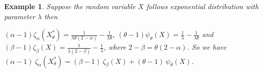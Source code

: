 \documentclass[11pt,reqno]{amsart}
\theoremstyle{tight}
\newtheorem{example}{Example}[section]
\begin{document}
\begin{example}
Suppose the random variable
$X$ follows exponential distribution with parameter $\lambda$ then


$(\alpha-1)\zeta_\alpha(X_\theta^*)=\frac{1}{\lambda\theta(2-\alpha)}-\frac{1}{\lambda \theta}$, $(\theta-1)\psi_{\theta}(X)=\frac{1}{\lambda}-\frac{1}{\lambda \theta}$ and $(\beta-1)\zeta_{\beta}(X)=\frac{1}{\lambda(2-\beta)}-\frac{1}{\lambda}$, where $2-\beta=\theta(2-\alpha)$. So we have $(\alpha-1)~\zeta_{\alpha}(X_\theta^*)=(\beta-1)~\zeta_{\beta}(X)+(\theta-1)~\psi_{\theta}(X)$.
\end{example}




\end{document}
